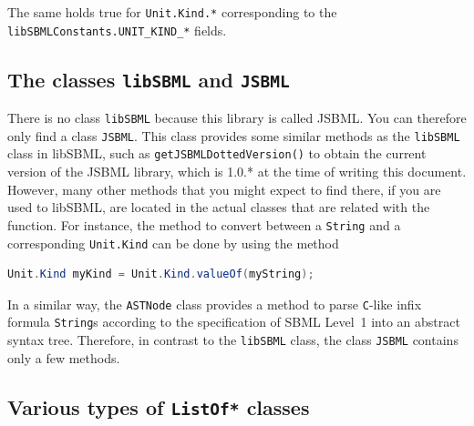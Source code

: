 The same holds true for \texttt{Unit.Kind.*} corresponding to the
\texttt{libSBMLConstants.UNIT\_KIND\_*}
%
fields.

\subsection{The classes \texttt{libSBML} and \texttt{JSBML}}

There is no class \texttt{libSBML} because this library is called JSBML.
%
You can therefore only find a class \texttt{JSBML}.
%
This class provides some similar methods as the \texttt{libSBML} class in
libSBML, such as \texttt{getJSBMLDottedVersion()}
%
to obtain the current version of the JSBML library, which is 1.0.* at the time of
writing this document. However, many other methods that you might expect
to find there, if you are used to libSBML, are located in the actual classes
that are related with the function. For instance, the method to convert between
a \texttt{String}
%
%
and a corresponding \texttt{Unit.Kind}
%
can be done by using the method
\begin{lstlisting}[language=Java,numbers=none]
Unit.Kind myKind = Unit.Kind.valueOf(myString);
\end{lstlisting}
In a similar way, the \texttt{ASTNode} class
provides a method to parse \texttt{C}-like infix formula
\texttt{String}s according to the
specification of SBML Level~1 \citep{Hucka2003} into an
abstract syntax tree. Therefore, in contrast to
the \texttt{libSBML} class, the class \texttt{JSBML}
contains only a few methods.


\subsection{Various types of \texttt{ListOf*} classes}



